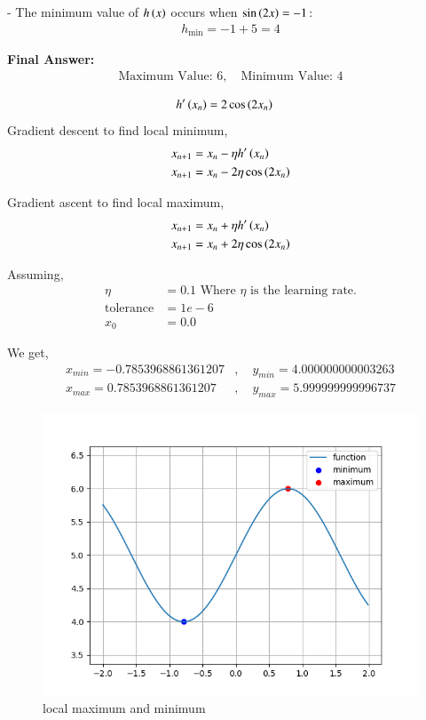 \documentclass[journal]{IEEEtran}
\begin{document}
- The minimum value of $ h\left(x\right) $ occurs when $ \sin\left(2x\right) = -1 $:
\begin{align}
    h_{\text{min}} = -1 + 5 = 4
\end{align}

\textbf{Final Answer:}
\begin{align}
    \text{Maximum Value: } 6, \quad \text{Minimum Value: } 4
\end{align}



\solution
\begin{align}
    h^\prime\left(x_{n}\right) &= 2\cos{\ensuremath{\left(2x_{n}\right)}}
\end{align}
Gradient descent to find local minimum,
\begin{align}
    x_{n+1} &= x_{n} - \eta h^\prime\left(x_{n}\right) \\
    x_{n+1} &= x_{n} - 2\eta \cos{\ensuremath{\left(2x_{n}\right)}}
\end{align}

Gradient ascent to find local maximum,
\begin{align}
    x_{n+1} &= x_{n} + \eta h^\prime\left(x_{n}\right) \\
    x_{n+1} &= x_{n} + 2\eta \cos{\ensuremath{\left(2x_{n}\right)}}
\end{align}



Assuming,
\begin{align}
    \eta &= 0.1   \text{  Where $\eta$ is the learning rate.}\\ 
    \text{tolerance} &= 1e-6 \\
    x_{0} &= 0.0
\end{align}

We get,
\begin{align}
    x_{min} = -0.7853968861361207&,\quad y_{min} = 4.000000000003263 \\
    x_{max} = 0.7853968861361207&,\quad y_{max} = 5.999999999996737
\end{align}

\begin{figure}[ht]
    \centering
    \includegraphics[width=\columnwidth]{figs/plot.png}
    \caption{local maximum and minimum}
    \label{fig:Plot1}
    \end{figure}
\end{document}
